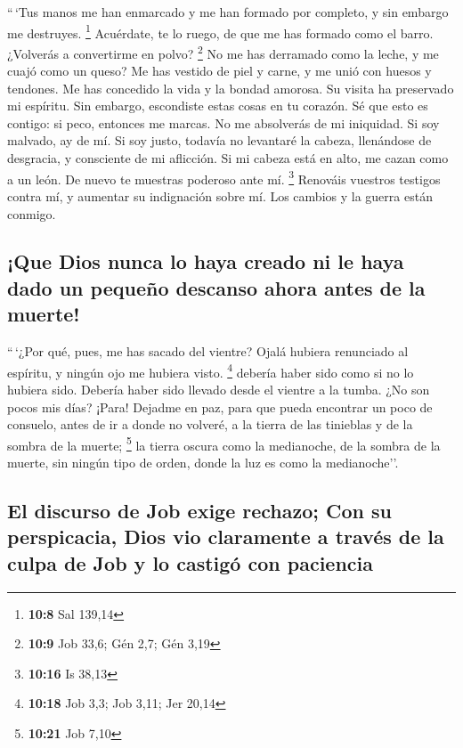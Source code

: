  ``\,`Tus manos me han enmarcado y me han formado por
completo, y sin embargo me destruyes. \footnote{\textbf{10:8} Sal 139,14}
 Acuérdate, te lo ruego, de que me has formado como el
barro. ¿Volverás a convertirme en polvo? \footnote{\textbf{10:9} Job
  33,6; Gén 2,7; Gén 3,19}  No me has derramado como la
leche, y me cuajó como un queso?  Me has vestido de piel
y carne, y me unió con huesos y tendones.  Me has
concedido la vida y la bondad amorosa. Su visita ha preservado mi
espíritu.  Sin embargo, escondiste estas cosas en tu
corazón. Sé que esto es contigo:  si peco, entonces me
marcas. No me absolverás de mi iniquidad.  Si soy
malvado, ay de mí. Si soy justo, todavía no levantaré la cabeza,
llenándose de desgracia, y consciente de mi aflicción. 
Si mi cabeza está en alto, me cazan como a un león. De nuevo te muestras
poderoso ante mí. \footnote{\textbf{10:16} Is 38,13} 
Renováis vuestros testigos contra mí, y aumentar su indignación sobre
mí. Los cambios y la guerra están conmigo.

\hypertarget{que-dios-nunca-lo-haya-creado-ni-le-haya-dado-un-pequeuxf1o-descanso-ahora-antes-de-la-muerte}{%
\subsection{¡Que Dios nunca lo haya creado ni le haya dado un pequeño
descanso ahora antes de la
muerte!}\label{que-dios-nunca-lo-haya-creado-ni-le-haya-dado-un-pequeuxf1o-descanso-ahora-antes-de-la-muerte}}

 ``\,`¿Por qué, pues, me has sacado del vientre? Ojalá
hubiera renunciado al espíritu, y ningún ojo me hubiera visto.
\footnote{\textbf{10:18} Job 3,3; Job 3,11; Jer 20,14} 
debería haber sido como si no lo hubiera sido. Debería haber sido
llevado desde el vientre a la tumba.  ¿No son pocos mis
días? ¡Para! Dejadme en paz, para que pueda encontrar un poco de
consuelo,  antes de ir a donde no volveré, a la tierra de
las tinieblas y de la sombra de la muerte; \footnote{\textbf{10:21} Job
  7,10}  la tierra oscura como la medianoche, de la
sombra de la muerte, sin ningún tipo de orden, donde la luz es como la
medianoche''.

\hypertarget{el-discurso-de-job-exige-rechazo-con-su-perspicacia-dios-vio-claramente-a-travuxe9s-de-la-culpa-de-job-y-lo-castiguxf3-con-paciencia}{%
\subsection{El discurso de Job exige rechazo; Con su perspicacia, Dios
vio claramente a través de la culpa de Job y lo castigó con
paciencia}\label{el-discurso-de-job-exige-rechazo-con-su-perspicacia-dios-vio-claramente-a-travuxe9s-de-la-culpa-de-job-y-lo-castiguxf3-con-paciencia}}

